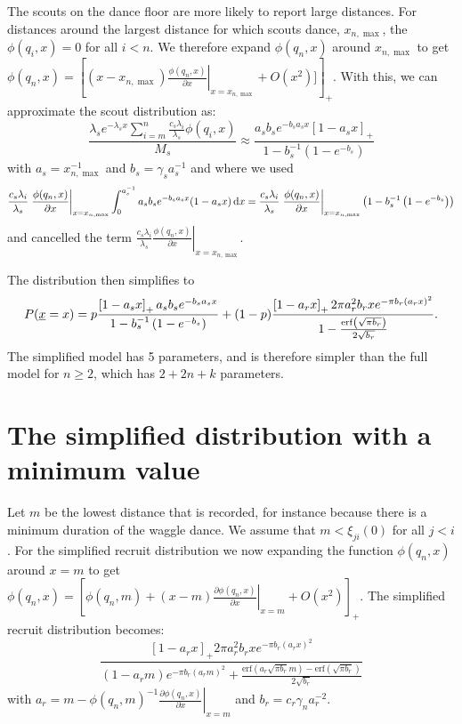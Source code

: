 \documentclass[12pt,letter]{amsart}
\newcommand{\df}[0]{{\,\rm d }}
\begin{document}
The scouts on the dance floor are more likely to report large distances. For distances around the largest distance for which scouts dance, $x_{n,\max}$, the $\phi(q_i, x)=0$ for all $i<n$. We therefore expand  $ \phi(q_n, x)$ around $x_{n, \max}$ to get $ \phi(q_n, x)=\left[( x- x_{n, \max})\left.\frac{\phi(q_n, x)}{\partial x}\right|_{x=x_{n, \max}}+ O(x^2)]\right]_+$. With this, we can approximate the scout distribution as:
$$\frac{\lambda_s e^{-\lambda_s x}\sum_{i=m}^n  \frac{c_s \lambda_i}{\lambda_s} \phi(q_i, x)  }{M_s}\approx \frac{a_s b_s e^{-b_s a_s x}  \left[ 1-a_s x\right]_+ }{1-b_s^{-1} \left(1-e^{-b_s}\right)}$$
with $a_s=x_{n,\max}^{-1}$ and $b_s=\gamma_s a_s^{-1}$
and where we used
$$ \frac{c_s \lambda_i}{\lambda_s}\left.\frac{\phi(q_n, x)}{\partial x}\right|_{x=x_{n, \max}} \int_{0}^{a_s^{-1}} a_s b_s e^{-b_s a_s x}  ( 1-a_s x)  \df x= \frac{c_s \lambda_i}{\lambda_s}\left.\frac{\phi(q_n, x)}{\partial x}\right|_{x=x_{n, \max}} \left( 1-b_s^{-1} \left(1-e^{-b_s}\right)\right)$$ and cancelled the term $\frac{c_s \lambda_i}{\lambda_s}\left.\frac{\phi(q_n, x)}{\partial x}\right|_{x=x_{n, \max}}.$

The distribution then simplifies to
$$P(\underline x= x )=p \frac{\left[ 1-a_s x\right]_+a_s b_s e^{-b_s a_s x}   }{1-b_s^{-1} \left(1-e^{-b_s}\right)}+(1-p) \frac{\left[1- a_r x\right]_+2 \pi a_r^2   b_r x e^{- \pi  b_r  (a_r x)^2}}{1-\frac{{\rm erf}\left(  \sqrt{\pi b_r}\right)}{2 \sqrt{b_r }}}.$$
The simplified model has 5 parameters, and is therefore simpler than the full model for $n \ge2$, which has $2+2n+k $ parameters.


\section*{The simplified distribution with a minimum value}
 Let $m$ be the lowest distance that is recorded, for instance because there is a minimum duration of the waggle dance. We assume that $m<\xi_{ji}(0)$ for all $j<i$. For the simplified recruit distribution we now expanding the function $ \phi(q_n, x)$ around $x=m$ to get $\phi(q_n, x)=\left[\phi(q_n, m)+(x-m)\left. \frac{\partial \phi(q_n, x)}{\partial x}\right|_{x=m}+ O(x^2)\right]_+$. The simplified recruit distribution becomes:
$$ \frac{\left[1- a_r x\right]_+2 \pi a_r^2 b_r  x e^{- \pi  b_r (a_r x)^2}}{\left(1-a_r m\right)e^{-\pi b_r (a_r m)^2 }+\frac{\text{erf}\left(a_r \sqrt{\pi b_r}m \right)-\text{erf}\left(\sqrt{\pi b_r}\right)}{2 \sqrt{b_r}}}$$
with $a_r=m-\phi(q_n, m)^{-1}\left. \frac{\partial \phi(q_n, x)}{\partial x}\right|_{x=m}$ and $b_r=c_r \gamma_n a_r^{-2}.$
\end{document}
